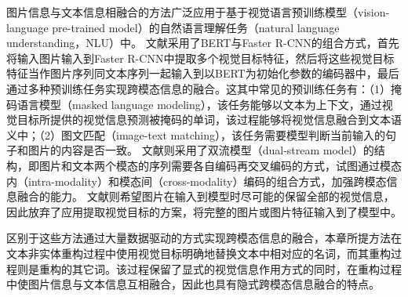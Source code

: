 图片信息与文本信息相融合的方法广泛应用于基于视觉语言预训练模型（vision-language pre-trained model）的自然语言理解任务（natural language understanding，NLU）中。
文献\cite{57_visual_bert,58_unicoder_vl,59_vl_bert,60_uniter}采用了BERT\cite{25_DBLP:conf/naacl/DevlinCLT19}与Faster R-CNN\cite{DBLP:conf/nips/RenHGS15}的组合方式，首先将输入图片输入到Faster R-CNN中提取多个视觉目标特征，然后将这些视觉目标特征当作图片序列同文本序列一起输入到以BERT为初始化参数的编码器中，最后通过多种预训练任务实现跨模态信息的融合。这其中常见的预训练任务有：（1）掩码语言模型（masked language modeling），该任务能够以文本为上下文，通过视觉目标所提供的视觉信息预测被掩码的单词，该过程能够将视觉信息融合到文本语义中；（2）图文匹配（image-text matching），该任务需要模型判断当前输入的句子和图片的内容是否一致。
文献\cite{61_vilbert,62_lxmert}则采用了双流模型（dual-stream model）的结构，即图片和文本两个模态的序列需要各自编码再交叉编码的方式，试图通过模态内（intra-modality）和模态间（cross-modality）编码的组合方式，加强跨模态信息融合的能力。
文献\cite{63_albef,64_pixel_bert,65_vilt}则希望图片在输入到模型时尽可能的保留全部的视觉信息，因此放弃了应用提取视觉目标的方案，将完整的图片或图片特征输入到了模型中。

区别于这些方法通过大量数据驱动的方式实现跨模态信息的融合，本章所提方法在文本非实体重构过程中使用视觉目标明确地替换文本中相对应的名词，而其重构过程则是重构的其它词。该过程保留了显式的视觉信息作用方式的同时，在重构过程中使图片信息与文本信息互相融合，因此也具有隐式跨模态信息融合的特点。






